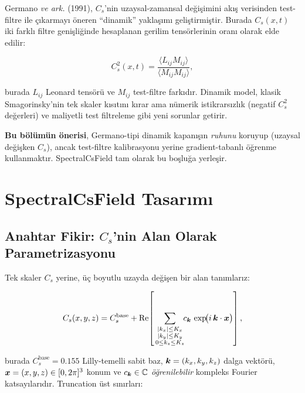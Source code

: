 Germano \emph{ve ark.} (1991), $C_s$'nin uzaysal-zamansal değişimini akış
verisinden test-filtre ile çıkarmayı öneren ``dinamik'' yaklaşımı
geliştirmiştir. Burada $C_s(x,t)$ iki farklı filtre genişliğinde
hesaplanan gerilim tensörlerinin oranı olarak elde edilir:

\begin{equation}
  C_s^{2}(x,t) = \frac{\langle L_{ij} M_{ij}\rangle}{\langle M_{ij} M_{ij}\rangle},
  \label{eq:germano-identity}
\end{equation}

\noindent burada $L_{ij}$ Leonard tensörü ve $M_{ij}$ test-filtre farkıdır.
Dinamik model, klasik Smagorinsky'nin tek skaler kısıtını kırar ama
nümerik istikrarsızlık (negatif $C_s^2$ değerleri) ve maliyetli test
filtreleme gibi yeni sorunlar getirir.

\textbf{Bu bölümün önerisi}, Germano-tipi dinamik kapanışın
\emph{ruhunu} koruyup (uzaysal değişken $C_s$), ancak test-filtre
kalibrasyonu yerine gradient-tabanlı öğrenme kullanmaktır. SpectralCsField
tam olarak bu boşluğa yerleşir.

\section{SpectralCsField Tasarımı}
\label{sec:spectral-cs-design}

\subsection{Anahtar Fikir: $C_s$'nin Alan Olarak Parametrizasyonu}

Tek skaler $C_s$ yerine, üç boyutlu uzayda değişen bir alan tanımlarız:

\begin{equation}
  C_s(x,y,z) = C_s^{\mathrm{base}} + \mathrm{Re}\!\left[\,
                \sum_{\substack{|k_x|\leq K_x \\ |k_y|\leq K_y \\ 0\leq k_z\leq K_z}}\!\!
                c_{\bm{k}}\,\exp\!\bigl(i\,\bm{k}\cdot\bm{x}\bigr)\right],
  \label{eq:spectral-cs-master}
\end{equation}

\noindent burada $C_s^{\mathrm{base}}=0.155$ Lilly-temelli sabit baz, $\bm{k}=
(k_x,k_y,k_z)$ dalga vektörü, $\bm{x}=(x,y,z)\in[0,2\pi]^3$ konum
ve $c_{\bm{k}}\in\mathbb{C}$ \emph{öğrenilebilir} kompleks Fourier
katsayılarıdır. Truncation üst sınırları:

